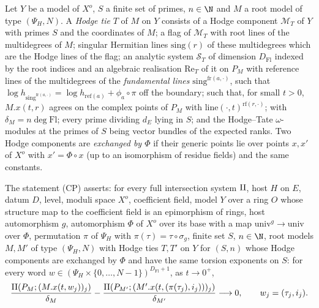 \begin{definition}\label{pf:tower:def-tie}
Let $Y$ be a model of $X^o$, $S$ a finite set of primes, $n\in\N$ and $M$ a root model of type $(\Psi_H,N)$. A \emph{Hodge tie}
$T$ of $M$ on $Y$ consists of a Hodge component $\mathcal M_T$ of $Y$ with primes $S$ and the coordinates of $M$; a flag of
$\mathcal M_T$ with root lines of the multidegrees of $M$; singular Hermitian lines $\mathrm{sing}(r)$ of these multidegrees which
are the Hodge lines of the flag; an analytic system $\mathcal S_T$ of dimension $D_{\mathrm{Fl}}$ indexed by the root indices and
an algebraic realisation $\mathrm{Re}_T$ of it on $P_M$ with reference lines of the multidegrees of the \emph{fundamental lines}
$\mathrm{sing}^{\mathrm{fr}(a,\cdot)}$, such that $\log h_{\mathrm{sing}^{\mathrm{fr}(a,\cdot)}}=\log h_{\mathrm{ref}(a)}+\phi_a\circ\pi$
off the boundary; such that, for small $t>0$, $M.x(t,r)$ agrees on the complex points of $P_M$ with
$\mathrm{line}(\cdot,t)^{\mathrm{rf}(r,\cdot)}$; with $\delta_M=n\deg\mathrm{Fl}$; every prime dividing $d_E$ lying in $S$; and the
Hodge--Tate $\omega$-modules at the primes of $S$ being vector bundles of the expected ranks. Two Hodge components are
\emph{exchanged by $\Phi$} if their generic points lie over points $x,x'$ of $X^o$ with $x'=\Phi\circ x$ (up to an isomorphism of
residue fields) and the same constants.
\end{definition}

\begin{definition}\label{pf:tower:def-cp}
The statement (CP) asserts: for every full intersection system $\mathrm{II}$, host $H$ on $E$, datum $D$, level, moduli space
$X^o$, coefficient field, model $Y$ over a ring $O$ whose structure map to the coefficient field is an epimorphism of rings,
host automorphism $g$, automorphism $\Phi$ of
$X^o$ over its base with a map $\mathrm{univ}^g\to\mathrm{univ}$ over $\Phi$, permutation $\pi$ of $\Psi_H$ with
$\pi(\tau)=\tau\circ\sigma_g$, finite set $S$, $n\in\N$, root models $M,M'$ of type $(\Psi_H,N)$ with Hodge ties $T,T'$ on $Y$
for $(S,n)$ whose Hodge components are exchanged by $\Phi$ and have the same torsion exponents on $S$: for every word
$w\in(\Psi_H\times\{0,\dots,N-1\})^{D_{\mathrm{Fl}}+1}$, as $t\to0^+$,
\[
\frac{\mathrm{II}(P_M;(M.x(t,w_j))_j)}{\delta_M}-\frac{\mathrm{II}(P_{M'};(M'.x(t,(\pi(\tau_j),i_j)))_j)}{\delta_{M'}}\longrightarrow0,
\qquad w_j=(\tau_j,i_j).
\]
\end{definition}

